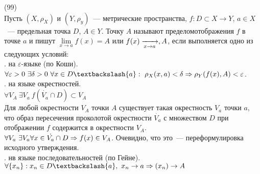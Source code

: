 (99)\\
Пусть $(X, \rho_X)$ и $(Y, \rho_y)$~--- метрические пространства, $f: D \subset X \to Y$, $a \in X$~--- предельная точка $D$, $A \in Y$. Точку $A$ называют пределомотображения $f$ в точке $a$ и пишут $\lim\limits_{x\to a}f(x) = A$ или $f(x)\xrightarrow[x\to a]{}, A$, если выполняется одно из следующих условий:\\
.  на $\varepsilon$-языке (по Коши).\\
$\forall \varepsilon > 0\ \exists\delta > 0\ \forall x \in D \bsl \{a\}:\ \rho_X(x, a) < \delta \Ra \rho_Y(f(x), A) < \varepsilon$.\\
.  на языке окрестностей.\\
$\forall V_A\ \exists V_a\ f(\dot{V_a} \cap D) \subset V_A$\\
Для любой окрестности $V_A$ точки $A$ существует такая окрестность $V_a$ точки $a$, что образ пересечения проколотой окрестности $\dot{V_a}$ с множеством $D$ при отображении $f$ содержится в окрестности $V_A$.\\
$\forall V_a\ \exists V_a \forall x \in \dot{V_a} \cap D \Rightarrow f(x) \in V_A$. Очевидно, что это~--- переформулировка исходного утверждения.\\
.  нв языке последовательностей (по Гейне).\\
$\forall \{x_n\}: x_n \in D \bsl \{a\},\ x_n \to a\Ra(x_n) \to A$